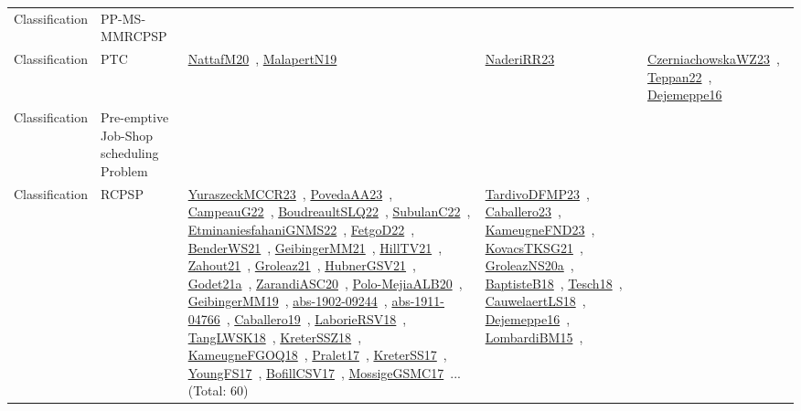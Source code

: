 {\begin{longtable}{lp{3cm}>{\raggedright\arraybackslash}p{6cm}>{\raggedright\arraybackslash}p{6cm}>{\raggedright\arraybackslash}p{8cm}}
Classification & PP-MS-MMRCPSP &  &  & \\
Classification & PTC & \href{works/NattafM20.pdf}{NattafM20}~\cite{NattafM20}, \href{works/MalapertN19.pdf}{MalapertN19}~\cite{MalapertN19} & \href{works/NaderiRR23.pdf}{NaderiRR23}~\cite{NaderiRR23} & \href{works/CzerniachowskaWZ23.pdf}{CzerniachowskaWZ23}~\cite{CzerniachowskaWZ23}, \href{works/Teppan22.pdf}{Teppan22}~\cite{Teppan22}, \href{works/Dejemeppe16.pdf}{Dejemeppe16}~\cite{Dejemeppe16}\\
Classification & Pre-emptive Job-Shop scheduling Problem &  &  & \\
Classification & RCPSP & \href{works/YuraszeckMCCR23.pdf}{YuraszeckMCCR23}~\cite{YuraszeckMCCR23}, \href{works/PovedaAA23.pdf}{PovedaAA23}~\cite{PovedaAA23}, \href{works/CampeauG22.pdf}{CampeauG22}~\cite{CampeauG22}, \href{works/BoudreaultSLQ22.pdf}{BoudreaultSLQ22}~\cite{BoudreaultSLQ22}, \href{works/SubulanC22.pdf}{SubulanC22}~\cite{SubulanC22}, \href{works/EtminaniesfahaniGNMS22.pdf}{EtminaniesfahaniGNMS22}~\cite{EtminaniesfahaniGNMS22}, \href{works/FetgoD22.pdf}{FetgoD22}~\cite{FetgoD22}, \href{works/BenderWS21.pdf}{BenderWS21}~\cite{BenderWS21}, \href{works/GeibingerMM21.pdf}{GeibingerMM21}~\cite{GeibingerMM21}, \href{works/HillTV21.pdf}{HillTV21}~\cite{HillTV21}, \href{works/Zahout21.pdf}{Zahout21}~\cite{Zahout21}, \href{works/Groleaz21.pdf}{Groleaz21}~\cite{Groleaz21}, \href{works/HubnerGSV21.pdf}{HubnerGSV21}~\cite{HubnerGSV21}, \href{works/Godet21a.pdf}{Godet21a}~\cite{Godet21a}, \href{works/ZarandiASC20.pdf}{ZarandiASC20}~\cite{ZarandiASC20}, \href{works/Polo-MejiaALB20.pdf}{Polo-MejiaALB20}~\cite{Polo-MejiaALB20}, \href{works/GeibingerMM19.pdf}{GeibingerMM19}~\cite{GeibingerMM19}, \href{works/abs-1902-09244.pdf}{abs-1902-09244}~\cite{abs-1902-09244}, \href{works/abs-1911-04766.pdf}{abs-1911-04766}~\cite{abs-1911-04766}, \href{works/Caballero19.pdf}{Caballero19}~\cite{Caballero19}, \href{works/LaborieRSV18.pdf}{LaborieRSV18}~\cite{LaborieRSV18}, \href{works/TangLWSK18.pdf}{TangLWSK18}~\cite{TangLWSK18}, \href{works/KreterSSZ18.pdf}{KreterSSZ18}~\cite{KreterSSZ18}, \href{works/KameugneFGOQ18.pdf}{KameugneFGOQ18}~\cite{KameugneFGOQ18}, \href{works/Pralet17.pdf}{Pralet17}~\cite{Pralet17}, \href{works/KreterSS17.pdf}{KreterSS17}~\cite{KreterSS17}, \href{works/YoungFS17.pdf}{YoungFS17}~\cite{YoungFS17}, \href{works/BofillCSV17.pdf}{BofillCSV17}~\cite{BofillCSV17}, \href{works/MossigeGSMC17.pdf}{MossigeGSMC17}~\cite{MossigeGSMC17}... (Total: 60) & \href{works/TardivoDFMP23.pdf}{TardivoDFMP23}~\cite{TardivoDFMP23}, \href{works/Caballero23.pdf}{Caballero23}~\cite{Caballero23}, \href{works/KameugneFND23.pdf}{KameugneFND23}~\cite{KameugneFND23}, \href{works/KovacsTKSG21.pdf}{KovacsTKSG21}~\cite{KovacsTKSG21}, \href{works/GroleazNS20a.pdf}{GroleazNS20a}~\cite{GroleazNS20a}, \href{works/BaptisteB18.pdf}{BaptisteB18}~\cite{BaptisteB18}, \href{works/Tesch18.pdf}{Tesch18}~\cite{Tesch18}, \href{works/CauwelaertLS18.pdf}{CauwelaertLS18}~\cite{CauwelaertLS18}, \href{works/Dejemeppe16.pdf}{Dejemeppe16}~\cite{Dejemeppe16}, \href{works/LombardiBM15.pdf}{LombardiBM15}~\cite{LombardiBM15}, 
\end{longtable}}
